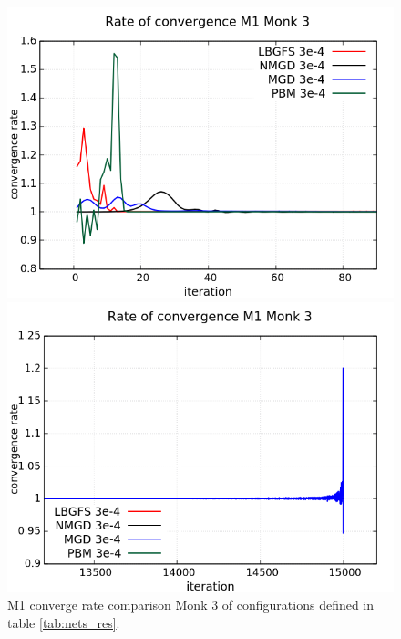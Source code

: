 \begin{figure}[H]
	\centering
	\begin{minipage}[t]{0.525\linewidth}		
		\includegraphics[width=\linewidth]{data/Comparison/Monk3/Monk3_M1_CR_zoomLeft.png}
	\end{minipage}%
	\begin{minipage}[t]{0.525\linewidth}
		\includegraphics[width=\linewidth]{data/Comparison/Monk3/Monk3_M1_CR_zoomRight.png}
	\end{minipage}
	\caption{M1 converge rate comparison Monk 3 of configurations defined in table \ref{tab:nets_res}.}
	\label{fig:CR-M1-Monk3-Zoom}
\end{figure}

